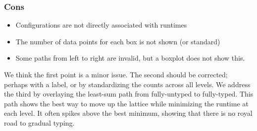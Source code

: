 \documentclass{article}
\begin{document}
\subsubsection{Cons}
\begin{itemize}
\item
  Configurations are not directly associated with runtimes
\item
  The number of data points for each box is not shown (or standard)
\item
  Some paths from left to right are invalid, but a boxplot does not show this.
\end{itemize}
We think the first point is a minor issue.
The second should be corrected; perhaps with a label, or by standardizing the counts across all levels.
We address the third by overlaying the least-sum path from fully-untyped to fully-typed.
This path shows the best way to move up the lattice while minimizing the runtime at each level.
It often spikes above the best minimum, showing that there is no royal road to gradual typing.
\end{document}
